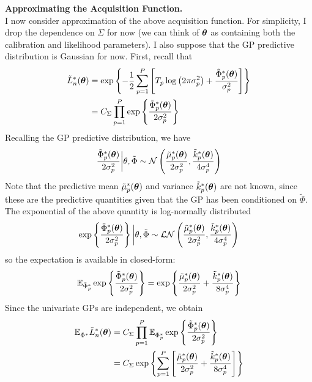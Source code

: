 \documentclass[12pt]{article}
\begin{document}
\bigskip
\noindent
\textbf{Approximating the Acquisition Function.} \\
I now consider approximation of the above acquisition function. For simplicity, I drop the dependence on $\Sigma$ for now (we can think of $\boldsymbol{\theta}$ as containing both the 
calibration and likelihood parameters). I also suppose that the GP predictive distribution is Gaussian for now. First, recall that 
\begin{align*}
\tilde{L}_n^*(\boldsymbol{\theta}) &= \exp\left\{ -\frac{1}{2} \sum_{p = 1}^{P} \left[T_{p} \log\left(2\pi \sigma_p^2\right) + \frac{\tilde{\Phi}^*_p(\boldsymbol{\theta})}{\sigma_p^2}\right] \right\} \\
				&= C_{\Sigma} \prod_{p = 1}^{P} \exp\left\{\frac{\tilde{\Phi}^*_p(\boldsymbol{\theta})}{2\sigma_p^2}\right\}
\end{align*}
Recalling the GP predictive distribution, we have 
\[\frac{\tilde{\Phi}^*_p(\boldsymbol{\theta})}{2\sigma_p^2}\bigg|\theta, \tilde{\Phi} \sim \mathcal{N}\left(\frac{\tilde{\mu}_p^*(\boldsymbol{\theta})}{2\sigma_p^2}, \frac{\tilde{k}_p^*(\boldsymbol{\theta})}{4\sigma_p^4} \right) \]
Note that the predictive mean $\tilde{\mu}_p^*(\boldsymbol{\theta})$ and variance $\tilde{k}_p^*(\boldsymbol{\theta})$ are not known, since these are the predictive quantities given that the GP has been 
conditioned on $\tilde{\Phi}$. 
The exponential of the above quantity is log-normally distributed
\[\exp\left\{\frac{\tilde{\Phi}^*_p(\boldsymbol{\theta})}{2\sigma_p^2}\right\}\bigg|\theta, \tilde{\Phi} \sim \mathcal{LN}\left(\frac{\tilde{\mu}_p^*(\boldsymbol{\theta})}{2\sigma_p^2}, \frac{\tilde{k}_p^*(\boldsymbol{\theta})}{4\sigma_p^4} \right) \]
so the expectation is available in closed-form:
\[\mathbb{E}_{\tilde{\Phi}_p^*} \exp\left\{\frac{\tilde{\Phi}^*_p(\boldsymbol{\theta})}{2\sigma_p^2}\right\} = \exp\left\{\frac{\tilde{\mu}_p^*(\boldsymbol{\theta})}{2\sigma_p^2} + \frac{\tilde{k}_p^*(\boldsymbol{\theta})}{8\sigma_p^4} \right\} \]
Since the univariate GPs are independent, we obtain 
\begin{align*}
\mathbb{E}_{\tilde{\Phi}^*} \tilde{L}_n^*(\boldsymbol{\theta}) &= C_\Sigma \prod_{p = 1}^{P} \mathbb{E}_{\tilde{\Phi}_p^*} \exp\left\{\frac{\tilde{\Phi}^*_p(\boldsymbol{\theta})}{2\sigma_p^2}\right\} \\
							   &= C_\Sigma \exp\left\{\sum_{p = 1}^{P} \left[ \frac{\tilde{\mu}_p^*(\boldsymbol{\theta})}{2\sigma_p^2} + \frac{\tilde{k}_p^*(\boldsymbol{\theta})}{8\sigma_p^4} \right] \right\}
\end{align*}
\end{document}
